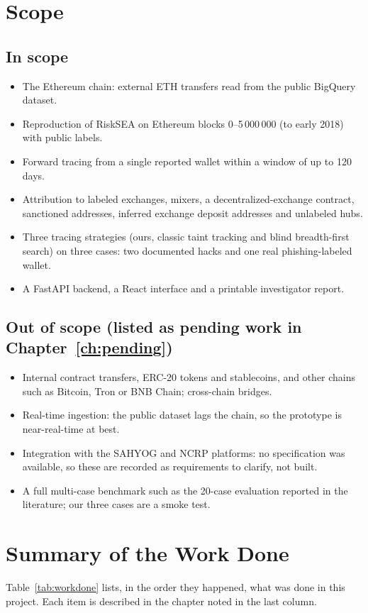 \section{Scope}
\subsection{In scope}
\begin{itemize}
\item The Ethereum chain: external ETH transfers read from the public BigQuery dataset.
\item Reproduction of RiskSEA on Ethereum blocks 0--5\,000\,000 (to early 2018) with public labels.
\item Forward tracing from a single reported wallet within a window of up to 120 days.
\item Attribution to labeled exchanges, mixers, a decentralized-exchange contract, sanctioned addresses, inferred exchange deposit addresses and unlabeled hubs.
\item Three tracing strategies (ours, classic taint tracking and blind breadth-first search) on three cases: two documented hacks and one real phishing-labeled wallet.
\item A FastAPI backend, a React interface and a printable investigator report.
\end{itemize}
\subsection{Out of scope (listed as pending work in Chapter~\ref{ch:pending})}
\begin{itemize}
\item Internal contract transfers, ERC-20 tokens and stablecoins, and other chains such as Bitcoin, Tron or BNB Chain; cross-chain bridges.
\item Real-time ingestion: the public dataset lags the chain, so the prototype is near-real-time at best.
\item Integration with the SAHYOG and NCRP platforms: no specification was available, so these are recorded as requirements to clarify, not built.
\item A full multi-case benchmark such as the 20-case evaluation reported in the literature; our three cases are a smoke test.
\end{itemize}

\section{Summary of the Work Done}
Table~\ref{tab:workdone} lists, in the order they happened, what was done in this project. Each item is described in the chapter noted in the last column.

